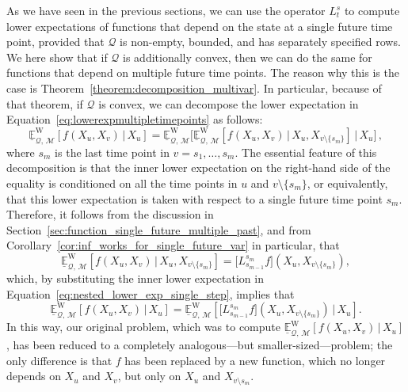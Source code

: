 \documentclass[10pt,a4paper]{paper}
\theoremstyle{definition}
\newcommand{\states}{\mathcal{X}}
\newcommand{\gambles}{\mathcal{L}}
\newcommand{\rateset}{\mathcal{Q}}
\begin{document}
As we have seen in the previous sections, we can use the operator $L_t^s$ to compute lower expectations of functions that depend on the state at a single future time point, provided that $\rateset$ is non-empty, bounded, and has separately specified rows. We here show that if $\rateset$ is additionally convex, then we can do the same for functions that depend on multiple future time points. %
The reason why this is the case is Theorem~\ref{theorem:decomposition_multivar}. In particular, because of that theorem, if $\rateset$ is convex, we can decompose the lower expectation in Equation~\eqref{eq:lowerexpmultipletimepoints} as follows:
\begin{equation}\label{eq:nested_lower_exp_single_step}
\underline{\mathbb{E}}_{\rateset,\,\mathcal{M}}^{\mathrm{W}}[f(X_u,X_v)\,\vert\,X_u] = \underline{\mathbb{E}}_{\rateset,\,\mathcal{M}}^{\mathrm{W}}\bigl[ \underline{\mathbb{E}}_{\rateset,\,\mathcal{M}}^{\mathrm{W}}[f(X_u,X_v)\,\vert\,X_u,X_{v\setminus\{s_m\}}] \,\big\vert\,X_u\bigr]\,,
\end{equation}
where $s_m$ is the last time point in $v=s_1,\dots,s_m$. The essential feature of this decomposition is that the inner lower expectation on the right-hand side of the equality is conditioned on all the time points in $u$ and $v\setminus\{s_m\}$, or equivalently, that this lower expectation is taken with respect to a single future time point $s_m$. Therefore, it follows from the discussion in Section~\ref{sec:function_single_future_multiple_past}, and from Corollary~\ref{cor:inf_works_for_single_future_var} in particular, that
\begin{equation*}
\underline{\mathbb{E}}_{\rateset,\,\mathcal{M}}^{\mathrm{W}}[f(X_u,X_v)\,\vert\,X_u,X_{v\setminus\{s_m\}}]=\big[L_{s_{m-1}}^{s_m}f\big]\left(X_u,X_{v\setminus\{s_m\}}\right),
\end{equation*}
which, by substituting the inner lower expectation in Equation~\eqref{eq:nested_lower_exp_single_step}, implies that
\begin{equation*}
\underline{\mathbb{E}}_{\rateset,\,\mathcal{M}}^{\mathrm{W}}[f(X_u,X_v)\,\vert\,X_u] = \underline{\mathbb{E}}_{\rateset,\,\mathcal{M}}^{\mathrm{W}}\left[ \big[L_{s_{m-1}}^{s_m}f\big]\left(X_u,X_{v\setminus\{s_m\}}\right) \,\big\vert\,X_u\right].
\end{equation*}
In this way, our original problem, which was to compute $\underline{\mathbb{E}}_{\rateset,\,\mathcal{M}}^{\mathrm{W}}[f(X_u,X_v)\,\vert\,X_u]$, has been reduced to a completely analogous---but smaller-sized---problem; the only difference is that $f$ has been replaced by a new function, which no longer depends on $X_u$ and $X_{v}$, but only on $X_u$ and $X_{v\setminus s_m}$.
\end{document}
